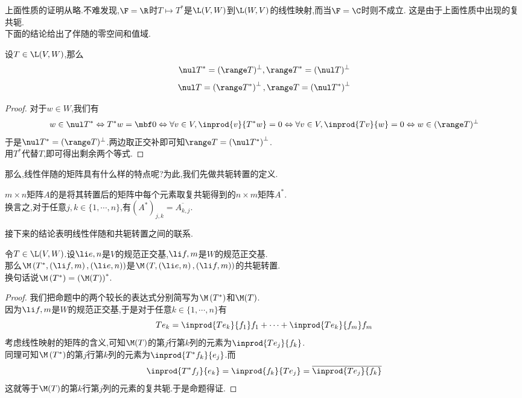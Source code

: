\documentclass{ctexart}
\begin{document}
上面性质的证明从略.不难发现,$\F=\R$时$T\mapsto T^*$是$\L(V,W)$到$\L(W,V)$的线性映射,而当$\F=\C$时则不成立.%
这是由于上面性质中出现的复共轭.\\
下面的结论给出了伴随的零空间和值域.
\begin{formal}[1.4 伴随的零空间和值域]
    设$T\in\L(V,W)$,那么
    \[\nul T^*=(\range T)^\bot,\range T^*=(\nul T)^\bot\]
    \[\nul T=\left(\range T^*\right)^\bot,\range T=\left(\nul T^*\right)^\bot\]
\end{formal}
\begin{proof}
    对于$w\in W$,我们有
    \[w\in\nul T^*\Leftrightarrow T^*w=\mbf0
    \Leftrightarrow\forall v\in V,\inprod{v}{T^*w}=0
    \Leftrightarrow\forall v\in V,\inprod{Tv}{w}=0
    \Leftrightarrow w\in(\range T)^\bot\]
    于是$\nul T^*=(\range T)^\bot$.两边取正交补即可知$\range T=\left(\nul T^*\right)^\bot$.\\
    用$T^*$代替$T$,即可得出剩余两个等式.
\end{proof}\noindent
那么,线性伴随的矩阵具有什么样的特点呢?为此,我们先做共轭转置的定义.
\begin{definition}[1.5 定义:共轭转置]
    $m\times n$矩阵$A$的是将其转置后的矩阵中每个元素取复共轭得到的$n\times m$矩阵$A^*$.\\
    换言之,对于任意$j,k\in\{1,\cdots,n\}$,有$\left(A^*\right)_{j,k}=\overline{A_{k,j}}$.
\end{definition}\noindent
接下来的结论表明线性伴随和共轭转置之间的联系.
\begin{formal}[1.6 线性伴随与共轭转置]
    令$T\in\L(V,W)$.设$\li e,n$是$V$的规范正交基,$\li f,m$是$W$的规范正交基.\\
    那么$\M\left(T^*,\left(\li f,m\right),\left(\li e,n\right)\right)$是$\M\left(T,\left(\li e,n\right),\left(\li f,m\right)\right)$的共轭转置.\\
    换句话说$\M\left(T^*\right)=\left(\M(T)\right)^*$.
\end{formal}
\begin{proof}
    我们把命题中的两个较长的表达式分别简写为$\M\left(T^*\right)$和$\M(T)$.\\
    因为$\li f,m$是$W$的规范正交基,于是对于任意$k\in\{1,\cdots,n\}$有
    \[Te_k=\inprod{Te_k}{f_1}f_1+\cdots+\inprod{Te_k}{f_m}f_m\]
    考虑线性映射的矩阵的含义,可知$\M(T)$的第$j$行第$k$列的元素为$\inprod{Te_j}{f_k}$.\\
    同理可知$\M\left(T^*\right)$的第$j$行第$k$列的元素为$\inprod{T^*f_k}{e_j}$.而
    \[\inprod{T^*f_j}{e_k}=\inprod{f_k}{Te_j}=\overline{\inprod{Te_j}{f_k}}\]
    这就等于$\M(T)$的第$k$行第$j$列的元素的复共轭.于是命题得证.
\end{proof}\noindent
\end{document}
